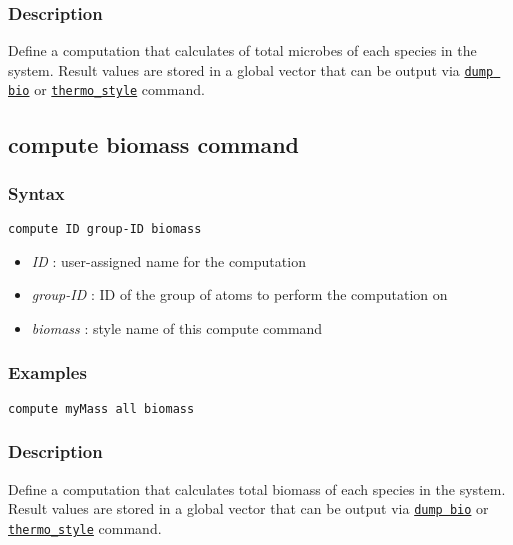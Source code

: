 \documentclass[11pt,a4paper,openright]{article}
\begin{document}
\subsubsection*{Description}

Define a computation that calculates of total
microbes of each species in the system.
Result values are stored in 
a global vector that can be output via \hyperref[dumpbio]{\tt dump bio}
or \href{http://lammps.sandia.gov/doc/thermo_style.html}{\tt thermo\_style} command.

\subsection{compute biomass command}
\label{cbiomass}

\subsubsection*{Syntax}
\begin{Verbatim}[frame=single]
compute ID group-ID biomass
\end{Verbatim}

\begin{itemize}  [nosep]
\item
	{\it ID }: user-assigned name for the computation
\item
	{\it group-ID }: ID of the group of atoms to perform the computation on
\item
	{\it biomass }: style name of this compute command
\end{itemize}

\subsubsection*{Examples}

\begin{Verbatim}[frame=single]
compute myMass all biomass
\end{Verbatim}

\subsubsection*{Description}

Define a computation that calculates
total biomass of each species in the system.
Result values are stored in 
a global vector that can be output via \hyperref[dumpbio]{\tt dump bio}
or \href{http://lammps.sandia.gov/doc/thermo_style.html}{\tt thermo\_style} command.
\end{document}
